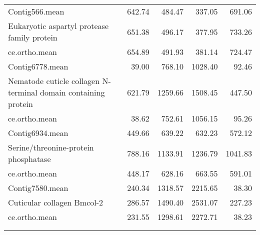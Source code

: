 \begin{longtable}{p{7cm}rrrr}
   \hline
Contig566.mean & 642.74 & 484.47 & 337.05 & 691.06 \\ 
  Eukaryotic aspartyl protease family protein & 651.38 & 496.17 & 377.95 & 733.26 \\ 
  ce.ortho.mean & 654.89 & 491.93 & 381.14 & 724.47 \\ 
   \hline
Contig6778.mean & 39.00 & 768.10 & 1028.40 & 92.46 \\ 
  Nematode cuticle collagen N-terminal domain containing protein & 621.79 & 1259.66 & 1508.45 & 447.50 \\ 
  ce.ortho.mean & 38.62 & 752.61 & 1056.15 & 95.26 \\ 
   \hline
Contig6934.mean & 449.66 & 639.22 & 632.23 & 572.12 \\ 
  Serine/threonine-protein phosphatase & 788.16 & 1133.91 & 1236.79 & 1041.83 \\ 
  ce.ortho.mean & 448.17 & 628.16 & 663.55 & 591.01 \\ 
   \hline
Contig7580.mean & 240.34 & 1318.57 & 2215.65 & 38.30 \\ 
  Cuticular collagen Bmcol-2 & 286.57 & 1490.40 & 2531.07 & 227.23 \\ 
  ce.ortho.mean & 231.55 & 1298.61 & 2272.71 & 38.23 \\ 
  \hline\\
\label{eel.sing.diff}
\end{longtable}

